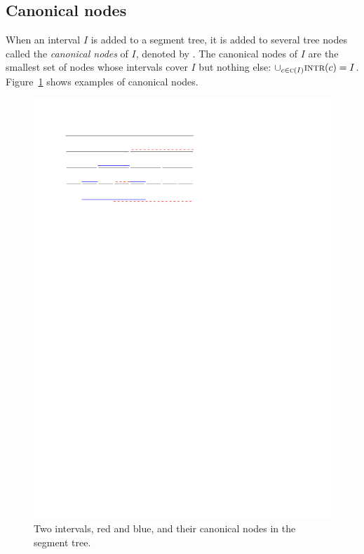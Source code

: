 \documentclass[english,gradu]{tktltiki2018}
\begin{document}
\subsection{Canonical nodes}

When an interval $I$ is added to a segment tree, it is added to several tree nodes called the \emph{canonical nodes} of $I$, denoted by .
The canonical nodes of $I$ are the smallest set of nodes whose intervals cover $I$ but nothing else: $\cup_{c\in\textsc{c}(I)} \textsc{intr}(c)=I$.
Figure~\ref{fig:canon} shows examples of canonical nodes.

\begin{figure}\centering
	\includegraphics[scale=0.7,page=1]{fig/canon}
	\caption{Two intervals, red and blue, and their canonical nodes in the segment tree.}\label{fig:canon}
\end{figure}
\end{document}
